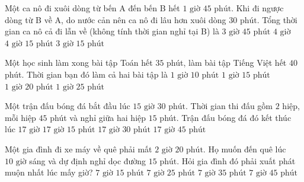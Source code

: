 \begin{ex} %
Một ca nô đi xuôi dòng từ bến A đến bến B hết $1\text{ giờ } 45\text{ phút}$. Khi đi ngược dòng từ B về A, do nước cản nên ca nô đi lâu hơn xuôi dòng $30\text{ phút}$. Tổng thời gian ca nô cả đi lẫn về (không tính thời gian nghỉ tại B) là
\choice
{$3\text{ giờ } 45\text{ phút}$}
{\True $4\text{ giờ}$}
{$4\text{ giờ } 15\text{ phút}$}
{$3\text{ giờ } 15\text{ phút}$}
\end{ex}

\begin{ex} %
Một học sinh làm xong bài tập Toán hết $35$ phút, làm bài tập Tiếng Việt hết $40$ phút. Thời gian bạn đó làm cả hai bài tập là
\choice
{$1\text{ giờ } 10\text{ phút}$}
{\True $1\text{ giờ } 15\text{ phút}$}
{$1\text{ giờ } 20\text{ phút}$}
{$1\text{ giờ } 25\text{ phút}$}
\end{ex}

\begin{ex} %
Một trận đấu bóng đá bắt đầu lúc $15\text{ giờ } 30\text{ phút}$. Thời gian thi đấu gồm $2$ hiệp, mỗi hiệp $45$ phút và nghỉ giữa hai hiệp $15$ phút. Trận đấu bóng đá đó kết thúc lúc
\choice
{$17\text{ giờ}$}
{\True $17\text{ giờ } 15\text{ phút}$}
{$17\text{ giờ } 30\text{ phút}$}
{$17\text{ giờ } 45\text{ phút}$}
\end{ex}

\begin{ex} %
Một gia đình đi xe máy về quê phải mất $2\text{ giờ } 20\text{ phút}$. Họ muốn đến quê lúc $10\text{ giờ}$ sáng và dự định nghỉ dọc đường $15\text{ phút}$. Hỏi gia đình đó phải xuất phát muộn nhất lúc mấy giờ?
\choice
{$7\text{ giờ } 15\text{ phút}$}
{\True $7\text{ giờ } 25\text{ phút}$}
{$7\text{ giờ } 35\text{ phút}$}
{$7\text{ giờ } 45\text{ phút}$}
\end{ex}

